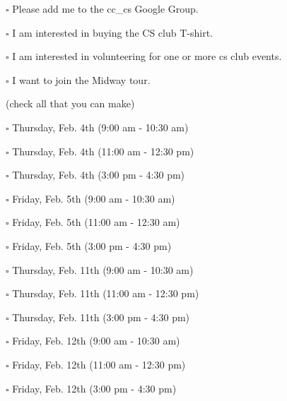 \begin{description}
\item[{Name:}] 
\item[{Email:}] 
\item[{Major:}] 
\item[{Year in school:}] 
\item $\square$ Please add me to the cc\_cs Google Group.
\item $\square$ I am interested in buying the CS club T-shirt.
\item $\square$ I am interested in volunteering for one or more cs club events.
\item $\square$ I want to join the Midway tour. 
\begin{description}
\item[{Available Times}] (check all that you can make)
\item $\square$ Thursday, Feb. 4th (9:00 am - 10:30 am)
\item $\square$ Thursday, Feb. 4th (11:00 am - 12:30 pm)
\item $\square$ Thursday, Feb. 4th (3:00 pm - 4:30 pm)
\item $\square$ Friday, Feb. 5th (9:00 am - 10:30 am)
\item $\square$ Friday, Feb. 5th (11:00 am - 12:30 am)
\item $\square$ Friday, Feb. 5th (3:00 pm - 4:30 pm)
\item $\square$ Thursday, Feb. 11th (9:00 am - 10:30 am)
\item $\square$ Thursday, Feb. 11th (11:00 am - 12:30 pm)
\item $\square$ Thursday, Feb. 11th (3:00 pm - 4:30 pm)
\item $\square$ Friday, Feb. 12th (9:00 am - 10:30 am)
\item $\square$ Friday, Feb. 12th (11:00 am - 12:30 pm)
\item $\square$ Friday, Feb. 12th (3:00 pm - 4:30 pm)
\end{description}
\end{description}



